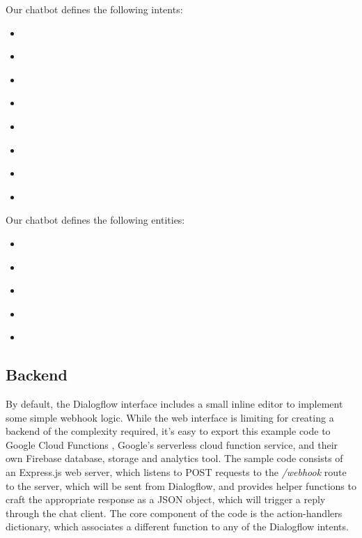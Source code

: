 Our chatbot defines the following intents:
\begin{itemize}
  \item \textit{}
  \item \textit{}
  \item \textit{}
  \item \textit{}
  \item \textit{}
  \item \textit{}
  \item \textit{}
  \item \textit{}
\end{itemize}
Our chatbot defines the following entities:
\begin{itemize}
  \item \textit{}
  \item \textit{}
  \item \textit{}
  \item \textit{}
  \item \textit{}
\end{itemize}

\subsection*{Backend}
By default, the Dialogflow interface includes a small inline editor to implement some simple webhook logic. While the web interface is limiting for creating a backend of the complexity required, it's easy to export this example code to Google Cloud Functions \cite{gcfwebsite}, Google's serverless cloud function service, and their own Firebase database, storage and analytics tool. 
The sample code consists of an Express.js \cite{expresswebsite} web server, which listens to POST requests to the \textit{/webhook} route to the server, which will be sent from Dialogflow, and provides helper functions to craft the appropriate response as a JSON object, which will trigger a reply through the chat client. The core component of the code is the action-handlers dictionary, which associates a different function to any of the Dialogflow intents. \\

